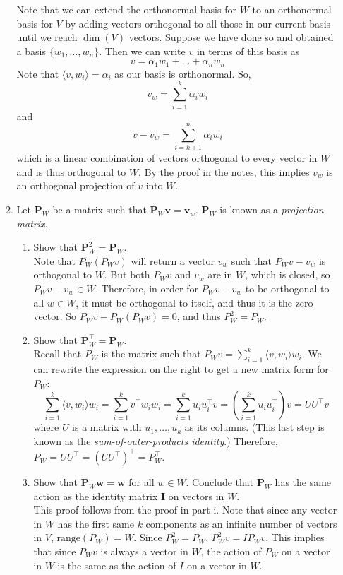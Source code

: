 \documentclass{article}
\begin{document}
\begin{enumerate}[label=\arabic*.]
\begin{enumerate}[label=(\alph*)]
	{\color{blue} Note that we can extend the orthonormal basis for $W$ to an orthonormal basis for $V$ by adding vectors orthogonal to all those in our current basis until we reach $\dim(V)$ vectors. Suppose we have done so and obtained a basis $\{w_1, \ldots, w_n\}$. Then we can write $v$ in terms of this basis as $$v = \alpha_1w_1 + \ldots + \alpha_nw_n$$ Note that $\langle v, w_i\rangle = \alpha_i$ as our basis is orthonormal. So, $$v_w = \sum\limits_{i=1}^k \alpha_iw_i$$ and $$v -v_w = \sum\limits_{i = k+1}^n \alpha_iw_i$$ which is a linear combination of vectors orthogonal to every vector in $W$ and is thus orthogonal to $W$. By the proof in the notes, this implies $v_w$ is an orthogonal projection of $v$ into $W$.}
	\item Let $\mathbf{P}_W$ be a matrix such that $\mathbf{P}_W\mathbf{v} = \mathbf{v}_w$. $\mathbf{P}_W$ is known as a \textit{projection matrix}.
	\begin{enumerate}[label=\roman*.]
	\item Show that $\mathbf{P}_W^2 = \mathbf{P}_W$. \\
	{\color{blue} Note that $P_W(P_Wv)$ will return a vector $v_w$ such that $P_Wv - v_w$ is orthogonal to $W$. But both $P_Wv$ and $v_w$ are in $W$, which is closed, so $P_Wv - v_w \in W$. Therefore, in order for $P_Wv - v_w$ to be orthogonal to all $w \in W$, it must be orthogonal to itself, and thus it is the zero vector. So $P_Wv - P_W(P_Wv) = 0$, and thus $P^2_W = P_W$.}
	\item Show that $\mathbf{P}_W^{\top} = \mathbf{P}_W$. \\
	{\color{blue} Recall that $P_W$ is the matrix such that $P_Wv = \sum\limits_{i=1}^k \langle v, w_i \rangle w_i$. We can rewrite the expression on the right to get a new matrix form for $P_W$: $$\sum\limits_{i=1}^k \langle v, w_i \rangle w_i = \sum\limits_{i=1}^k v^{\top}w_iw_i = \sum\limits_{i=1}^k u_iu_i^{\top}v = (\sum\limits_{i=1}^k u_iu_i^{\top})v = UU^{\top}v$$ where $U$ is a matrix with $u_1, \ldots, u_k$ as its columns. (This last step is known as the \textit{sum-of-outer-products identity}.) Therefore, $P_W = UU^{\top} = (UU^{\top})^{\top} = P_W^{\top}$.}
	\item Show that $\mathbf{P}_W\mathbf{w} = \mathbf{w}$ for all $w \in W$. Conclude that $\mathbf{P}_W$ has the same action as the identity matrix $\mathbf{I}$ on vectors in $W$.\\
	{\color{blue} This proof follows from the proof in part i. Note that since any vector in $W$ has the first same $k$ components as an infinite number of vectors in $V$, $\text{range}(P_W) = W$. Since $P^2_W = P_W$, $P^2_Wv = IP_Wv$. This implies that since $P_Wv$ is always a vector in $W$, the action of $P_W$ on a vector in $W$ is the same as the action of $I$ on a vector in $W$.}

\end{enumerate}
\end{enumerate}
\end{enumerate}
\end{document}
